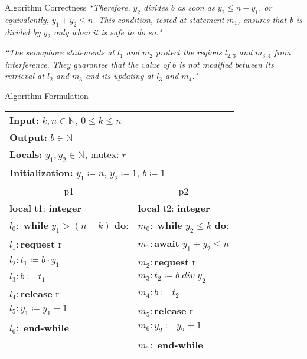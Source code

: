 \documentclass[xcolor=dvipsnames]{beamer}
\begin{document}
\begin{frame}{Algorithm Correctness}
\textit{``Therefore, $y_2$ divides $b$ as soon as $y_2 \leq n - y_1$, or equivalently, $y_1 + y_2 \leq n$. This condition, tested at statement $m_1$, ensures that b is divided by $y_2$ only when it is safe to do so."}

\hfill
\pause

\textit{``The semaphore statements at $l_1$ and $m_2$ protect the regions $l_{2,3}$ and $m_{3,4}$ from interference. They guarantee that the value of $b$ is not modified between its retrieval at $l_2$ and $m_3$ and its updating at $l_3$ and $m_4$."}


\end{frame}

\begin{frame}{Algorithm Formulation}

\begin{center}
	\begin{tabular}{|l|l|}
	\hline
	\multicolumn{2}{|l|}{\textbf{Input:} $k, n \in \mathbb{N}$, $0 \leq k \leq n$} \\
	\multicolumn{2}{|l|}{\textbf{Output:} $b \in \mathbb{N}$} \\
	\multicolumn{2}{|l|}{\textbf{Locals:} $y_1, y_2 \in \mathbb{N}$, mutex: $r$} \\
	\multicolumn{2}{|l|}{\textbf{Initialization:} $y_1 \coloneqq n$, $y_2 \coloneqq 1$, $b \coloneqq 1$} \\
	
	\hline
	\multicolumn{1}{|c|}{p1} & \multicolumn{1}{|c|}{p2}\\
	\hline
	\textbf{local} t1: \textbf{integer} & \textbf{local} t2: \textbf{integer} \\
	$l_0:$ \textbf{while} $y_1 > (n - k)$ \textbf{do}: & $m_0:$ \textbf{while} $y_2 \leq k$ \textbf{do}: \\
	$l_1:$\phantom{1111}\textbf{request} r & $m_1:$\phantom{1111}\textbf{await} $y_1 + y_2 \leq n$\\
	$l_2:$\phantom{1111}$t_1 \coloneqq b \cdot y_1$ & $m_2:$\phantom{1111}\textbf{request} r \\
	$l_3:$\phantom{1111}$b \coloneqq t_1$ & $m_3:$\phantom{1111}$t_2 \coloneqq b \; div \; y_2$ \\
	$l_4:$\phantom{1111}\textbf{release} r & $m_4:$\phantom{1111}$b \coloneqq t_2$\\
	$l_5:$\phantom{1111}$y_1 \coloneqq y_1 - 1$ & $m_5:$\phantom{1111}\textbf{release} r\\
	$l_6:$ \textbf{end-while} & $m_6:$\phantom{1111}$y_2 \coloneqq y_2 + 1$\\
	\phantom{1111} & $m_7:$ \textbf{end-while}\\
	\hline
		
	
	\end{tabular}
\end{center}

\end{frame}
\end{document}
